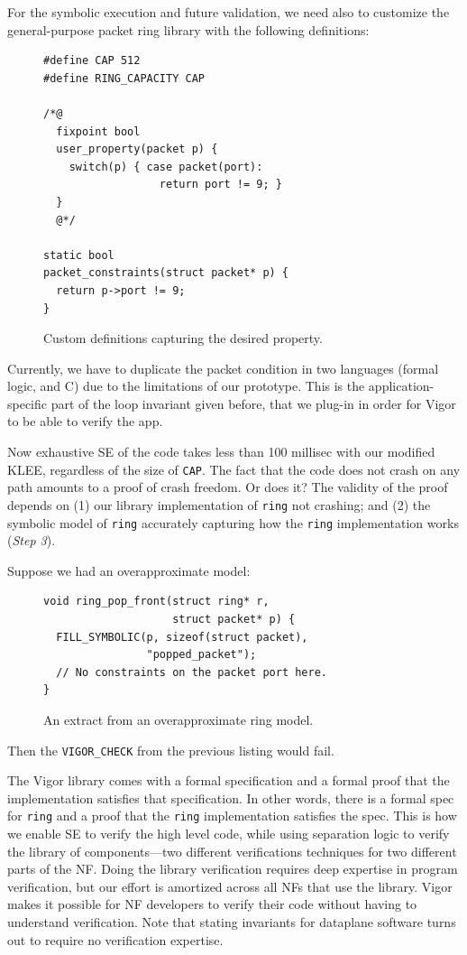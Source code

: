 \documentclass[letterpaper,twocolumn,10pt]{article}
\newcommand{\code}[1]{\lstinline{#1}}
\begin{document}
For the symbolic execution and future validation, we need also to customize the
general-purpose packet ring library with the following definitions:

\begin{figure}
\begin{lstlisting}
#define CAP 512
#define RING_CAPACITY CAP

/*@
  fixpoint bool
  user_property(packet p) {
    switch(p) { case packet(port):
                  return port != 9; }
  }
  @*/

static bool
packet_constraints(struct packet* p) {
  return p->port != 9;
}
\end{lstlisting}
  \caption{Custom definitions capturing the desired property.}
  \label{lst:customizations}
\end{figure}

Currently, we have to duplicate the packet condition in two languages (formal
logic, and C) due to the limitations of our prototype. This is the
application-specific part of the loop invariant given before, that we plug-in in
order for Vigor to be able to verify the app.

Now exhaustive SE of the code takes less than 100 millisec with our modified
KLEE, regardless of the size of \code{CAP}.  The fact that the code does not
crash on any path amounts to a proof of crash freedom. Or does it? The validity
of the proof depends on (1)  our library implementation of \code{ring} not
crashing; and (2) the symbolic model of \code{ring} accurately capturing how the
\code{ring} implementation works ({\em Step 3}).

Suppose we had an overapproximate model:
\begin{figure}[h!]
\begin{lstlisting}
void ring_pop_front(struct ring* r,
                    struct packet* p) {
  FILL_SYMBOLIC(p, sizeof(struct packet),
                "popped_packet");
  // No constraints on the packet port here.
}
\end{lstlisting}
  \caption{An extract from an overapproximate ring model.}
  \label{lst:overapproximate}
\end{figure}
Then the \code{VIGOR_CHECK} from the previous listing would fail.

The Vigor library comes with a formal specification and a formal proof that the
implementation satisfies that specification. In other words, there is a formal
spec for \code{ring} and a proof that the \code{ring} implementation satisfies
the spec. This is how we enable SE to verify the high level code, while using
separation logic to verify the library of components---two different
verifications techniques for two different parts of the NF. Doing the library
verification requires deep expertise in program verification, but our effort is
amortized across all NFs that use the library. Vigor makes it possible for NF
developers to verify their code without having to understand verification. Note
that stating invariants for dataplane software turns out to require no
verification expertise.
\end{document}
